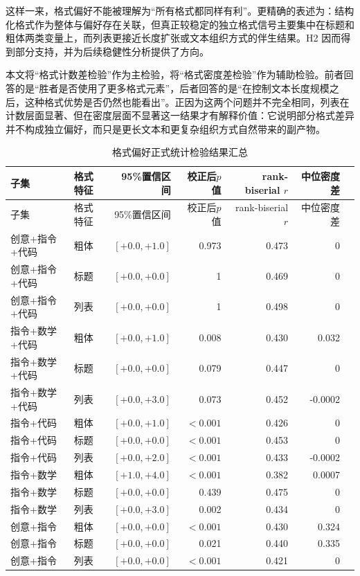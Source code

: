 \documentclass[9pt,a4paper,fontset=windows]{ctexart}
\theoremstyle{definition}
\numberwithin{equation}{section}
\begin{document}
这样一来，格式偏好不能被理解为“所有格式都同样有利”。更精确的表述为：结构化格式作为整体与偏好存在关联，但真正较稳定的独立格式信号主要集中在标题和粗体两类变量上，而列表更接近长度扩张或文本组织方式的伴生结果。H2 因而得到部分支持，并为后续稳健性分析提供了方向。

本文将“格式计数差检验”作为主检验，将“格式密度差检验”作为辅助检验。前者回答的是“胜者是否使用了更多格式元素”，后者回答的是“在控制文本长度规模之后，这种格式优势是否仍然也能看出”。正因为这两个问题并不完全相同，列表在计数层面显著、但在密度层面不显著这一结果才有解释价值：它说明部分格式差异并不构成独立偏好，而只是更长文本和更复杂组织方式自然带来的副产物。

\begin{longtable}{llrrrrr}
\caption{格式偏好正式统计检验结果汇总}\\
\toprule
子集 & 格式特征 & 95\%置信区间 & 校正后\(p\)值 & rank-biserial \(r\) & 中位密度差 \\
\midrule
\endfirsthead
\toprule
子集 & 格式特征 & 95\%置信区间 & 校正后\(p\)值 & rank-biserial \(r\) & 中位密度差 \\
\midrule
\endhead
创意+指令+代码 & 粗体 & \([+0.0,+1.0]\) & 0.973 & 0.473 & 0 \\
创意+指令+代码 & 标题 & \([+0.0,+0.0]\) & 1 & 0.469 & 0 \\
创意+指令+代码 & 列表 & \([+0.0,+0.0]\) & 1 & 0.498 & 0 \\
指令+数学+代码 & 粗体 & \([+0.0,+1.0]\) & 0.008 & 0.430 & 0.032 \\
指令+数学+代码 & 标题 & \([+0.0,+0.0]\) & 0.079 & 0.447 & 0 \\
指令+数学+代码 & 列表 & \([+0.0,+3.0]\) & 0.073 & 0.452 & -0.0002 \\
指令+代码 & 粗体 & \([+0.0,+1.0]\) & \(<0.001\) & 0.426 & 0 \\
指令+代码 & 标题 & \([+0.0,+0.0]\) & \(<0.001\) & 0.453 & 0 \\
指令+代码 & 列表 & \([+0.0,+2.0]\) & \(<0.001\) & 0.433 & -0.0002 \\
指令+数学 & 粗体 & \([+1.0,+4.0]\) & \(<0.001\) & 0.382 & 0.0007 \\
指令+数学 & 标题 & \([+0.0,+0.0]\) & 0.439 & 0.475 & 0 \\
指令+数学 & 列表 & \([+0.0,+3.0]\) & 0.002 & 0.434 & 0 \\
创意+指令 & 粗体 & \([+0.0,+0.0]\) & \(<0.001\) & 0.430 & 0.324 \\
创意+指令 & 标题 & \([+0.0,+0.0]\) & 0.021 & 0.440 & 0.335 \\
创意+指令 & 列表 & \([+0.0,+0.0]\) & \(<0.001\) & 0.421 & 0 \\

\end{longtable}
\end{document}
